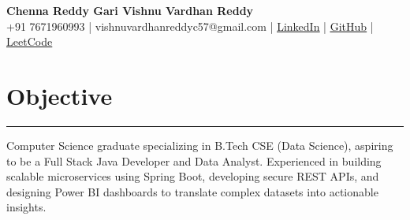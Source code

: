 \documentclass[9pt, a4paper]{extarticle}
\begin{document}
\linespread{0.92}\selectfont
\pagestyle{empty}
\begin{center}
  {\LARGE\textbf{Chenna Reddy Gari Vishnu Vardhan Reddy}} \\[3pt]
  \small
  +91 7671960993 \hspace{0.2em}|\hspace{0.2em}
  vishnuvardhanreddyc57@gmail.com \hspace{0.2em}|\hspace{0.2em}
  \href{https://linkedin.com/in/vishnu57}
       {\underline{LinkedIn}} \hspace{0.2em}|\hspace{0.2em}
  \href{https://github.com/vishnu99617}
       {\underline{GitHub}} \hspace{0.2em}|\hspace{0.2em}
  \href{https://leetcode.com/u/vishnu76719/}
       {\underline{LeetCode}}
\end{center}
\vspace{2pt}

\section*{Objective}
\vspace{0pt}
\hrule
\vspace{2pt}
Computer Science graduate specializing in B.Tech CSE (Data Science), aspiring to be a Full Stack Java Developer and Data Analyst. Experienced in building scalable microservices using Spring Boot, developing secure REST APIs, and designing Power BI dashboards to translate complex datasets into actionable insights.
\vspace{2pt}

\end{document}
